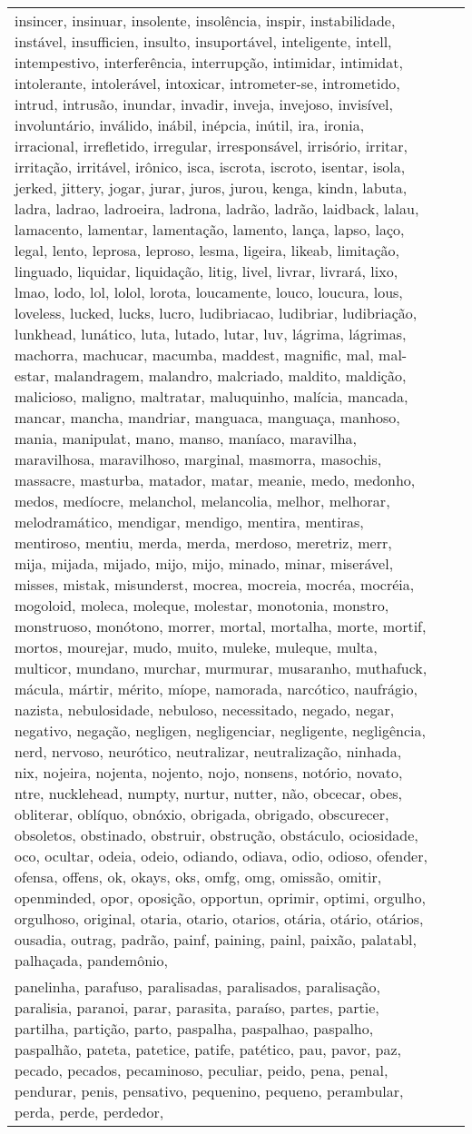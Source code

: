 \begin{longtable}{|*3{p{15cm}|}}
insincer, insinuar, insolente, insolência, inspir, instabilidade, instável, insufficien, insulto, insuportável, inteligente, intell, intempestivo, interferência, interrupção, intimidar, intimidat, intolerante, intolerável, intoxicar, intrometer-se, intrometido, intrud, intrusão, inundar, invadir, inveja, invejoso, invisível, involuntário, inválido, inábil, inépcia, inútil, ira, ironia, irracional, irrefletido, irregular, irresponsável, irrisório, irritar, irritação, irritável, irônico, isca, iscrota, iscroto, isentar, isola, jerked, jittery, jogar, jurar, juros, jurou, kenga, kindn, labuta, ladra, ladrao, ladroeira, ladrona, ladrão, ladrão, laidback, lalau, lamacento, lamentar, lamentação, lamento, lança, lapso, laço, legal, lento, leprosa, leproso, lesma, ligeira, likeab, limitação, linguado, liquidar, liquidação, litig, livel, livrar, livrará, lixo, lmao, lodo, lol, lolol, lorota, loucamente, louco, loucura, lous, loveless, lucked, lucks, lucro, ludibriacao, ludibriar, ludibriação, lunkhead, lunático, luta, lutado, lutar, luv, lágrima, lágrimas, machorra, machucar, macumba, maddest, magnific, mal, mal-estar, malandragem, malandro, malcriado, maldito, maldição, malicioso, maligno, maltratar, maluquinho, malícia, mancada, mancar, mancha, mandriar, manguaca, manguaça, manhoso, mania, manipulat, mano, manso, maníaco, maravilha, maravilhosa, maravilhoso, marginal, masmorra, masochis, massacre, masturba, matador, matar, meanie, medo, medonho, medos, medíocre, melanchol, melancolia, melhor, melhorar, melodramático, mendigar, mendigo, mentira, mentiras, mentiroso, mentiu, merda, merda, merdoso, meretriz, merr, mija, mijada, mijado, mijo, mijo, minado, minar, miserável, misses, mistak, misunderst, mocrea, mocreia, mocréa, mocréia, mogoloid, moleca, moleque, molestar, monotonia, monstro, monstruoso, monótono, morrer, mortal, mortalha, morte, mortif, mortos, mourejar, mudo, muito, muleke, muleque, multa, multicor, mundano, murchar, murmurar, musaranho, muthafuck, mácula, mártir, mérito, míope, namorada, narcótico, naufrágio, nazista, nebulosidade, nebuloso, necessitado, negado, negar, negativo, negação, negligen, negligenciar, negligente, negligência, nerd, nervoso, neurótico, neutralizar, neutralização, ninhada, nix, nojeira, nojenta, nojento, nojo, nonsens, notório, novato, ntre, nucklehead, numpty, nurtur, nutter, não, obcecar, obes, obliterar, oblíquo, obnóxio, obrigada, obrigado, obscurecer, obsoletos, obstinado, obstruir, obstrução, obstáculo, ociosidade, oco, ocultar, odeia, odeio, odiando, odiava, odio, odioso, ofender, ofensa, offens, ok, okays, oks, omfg, omg, omissão, omitir, openminded, opor, oposição, opportun, oprimir, optimi, orgulho, orgulhoso, original, otaria, otario, otarios, otária, otário, otários, ousadia, outrag, padrão, painf, paining, painl, paixão, palatabl, palhaçada, pandemônio, \\ panelinha, parafuso, paralisadas, paralisados, paralisação, paralisia, paranoi, parar, parasita, paraíso, partes, partie, partilha, partição, parto, paspalha, paspalhao, paspalho, paspalhão, pateta, patetice, patife, patético, pau, pavor, paz, pecado, pecados, pecaminoso, peculiar, peido, pena, penal, pendurar, penis, pensativo, pequenino, pequeno, perambular, perda, perde, perdedor, 
\end{longtable}
